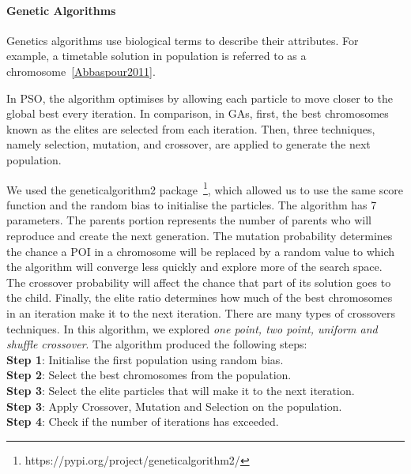 \paragraph{Genetic Algorithms}

Genetics algorithms use biological terms to describe
their attributes. For example, a timetable solution in
population is referred to as a chromosome~\ref{Abbaspour2011}. 

In PSO, the algorithm optimises by allowing each
particle to move closer to the global best every
iteration. In comparison, in GAs, first, the best
chromosomes known as the elites are selected from each
iteration. Then, three techniques, namely selection,
mutation, and crossover, are applied to generate the
next population.

We used the geneticalgorithm2 package~\footnote{https://pypi.org/project/geneticalgorithm2/},
which allowed us to use the same score function and
the random bias to initialise the particles. The
algorithm has 7 parameters. The parents portion
represents the number of parents who will reproduce
and create the next generation. The mutation
probability determines the chance a POI in a
chromosome will be replaced by a random value to which
the algorithm will converge less quickly and explore
more of the search space. The crossover probability
will affect the chance that part of its solution goes
to the child. Finally, the elite ratio determines how
much of the best chromosomes in an iteration make it
to the next iteration.  There are many types of
crossovers techniques. In this algorithm, we
explored \textit{one point, two point, uniform and shuffle crossover}.  The algorithm produced the following
steps: \\
\textbf{Step 1}: Initialise the first population using random bias. \\
\textbf{Step 2}: Select the best chromosomes from the population. \\ 
\textbf{Step 3}: Select the elite particles that will make it to the next iteration.\\
\textbf{Step 3}: Apply Crossover, Mutation and Selection on the population. \\
\textbf{Step 4}: Check if the number of iterations has exceeded. 

